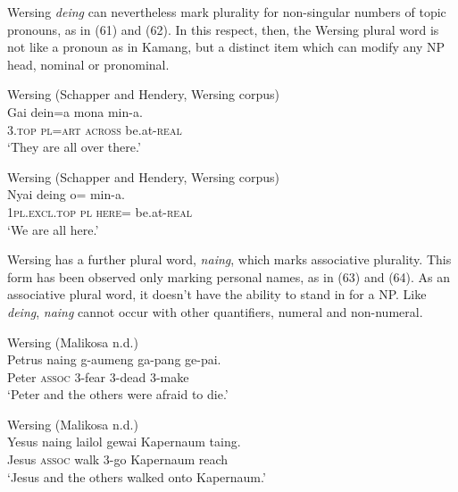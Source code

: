 Wersing \textit{d}\textit{eing} can nevertheless mark plurality for non-singular numbers of topic pronouns, as in (61) and (62). In this respect, then, the Wersing plural word is not like a pronoun as in Kamang, but a distinct item which can modify any NP head, nominal or pronominal.


\ea%
\label{ex:61}
Wersing (Schapper  and Hendery, Wersing corpus)\\
\gll  Gai dein=a mona min-a. \\
   \textsc{3.top} \textsc{pl}=\textsc{art} \textsc{across} be.at-\textsc{real}  \\
\glt `They are all over there.'
\z







\ea%
\label{ex:62}
Wersing (Schapper  and Hendery, Wersing corpus)\\
\gll  Nyai deing o= min-a. \\
  \textsc{1pl.excl.top} \textsc{pl}   \textsc{here=} be.at-\textsc{real}   \\
\glt `We are all here.'
\z






Wersing has a further plural word, \textit{naing}, which marks associative plurality. This form has been observed only marking personal names, as in (63) and (64). As an associative plural word, it doesn't have the ability to stand in for a NP. Like \textit{deing}, \textit{naing} cannot occur with other quantifiers, numeral and non-numeral.


\ea%
\label{ex:63}
Wersing (Malikosa n.d.)\\
\gll  Petrus naing g-aumeng ga-pang ge-pai. \\
  Peter \textsc{assoc} 3-fear 3-dead 3-make   \\
\glt `Peter and the others were afraid to die.'
\z







\ea%
\label{ex:64}
Wersing (Malikosa n.d.)\\
\gll  Yesus naing lailol gewai Kapernaum {taing.}\\
  Jesus \textsc{assoc} walk 3-go Kapernaum reach  \\
\glt `Jesus and the others walked onto Kapernaum.'
\z






